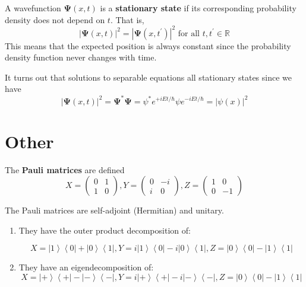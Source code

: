 \documentclass{article}
\newcommand{\ket}[1]{\ensuremath{\left|#1\right\rangle}}
\newcommand{\bra}[1]{\ensuremath{\left\langle#1\right|}}
\begin{document}
  \begin{definition}
    A wavefunction $\boldsymbol{\Psi}(x, t)$ is a \textbf{stationary state} if its corresponding probability density does not depend on $t$. That is, 
    \begin{equation} 
      |\boldsymbol{\Psi}(x, t)|^2 = |\boldsymbol{\Psi}(x, t^\prime)|^2  \text{ for all } t, t^\prime \in \mathbb{R}
    \end{equation}
    This means that the expected position is always constant since the probability density function never changes with time. 
  \end{definition}

  It turns out that solutions to separable equations all stationary states since we have 
  \begin{equation} 
    |\boldsymbol{\Psi}(x, t)|^2 = \boldsymbol{\Psi}^\ast \boldsymbol{\Psi} = \psi^\ast e^{+i E t/\hbar} \psi e^{- i E t/\hbar} = |\psi (x)|^2
  \end{equation}

\section{Other}

  \begin{definition}
    The \textbf{Pauli matrices} are defined 
      \[
        X = \begin{pmatrix} 0 & 1 \\ 1 & 0 \end{pmatrix},  
        Y = \begin{pmatrix} 0 & -i \\ i & 0 \end{pmatrix},   
        Z = \begin{pmatrix} 1 & 0 \\ 0 & -1 \end{pmatrix}  
      \]
  \end{definition}

  \begin{lemma}
    The Pauli matrices are self-adjoint (Hermitian) and unitary. 
  
    \begin{enumerate}
      \item They have the outer product decomposition of: 

        \[X = \ket{1} \bra{0} + \ket{0} \bra{1}, Y = i \ket{1} \bra{0} - i \ket{0} \bra{1}, Z = \ket{0} \bra{0} - \ket{1} \bra{1}\]

      \item They have an eigendecomposition of: 
        \begin{equation} 
          X = \ket{+} \bra{+} - \ket{-} \bra{-}, Y = i \ket{+} \bra{+} - i \ket{-} \bra{-}, Z = \ket{0} \bra{0} - \ket{1} \bra{1}   
        \end{equation}
    \end{enumerate}
  \end{lemma}
\end{document}
